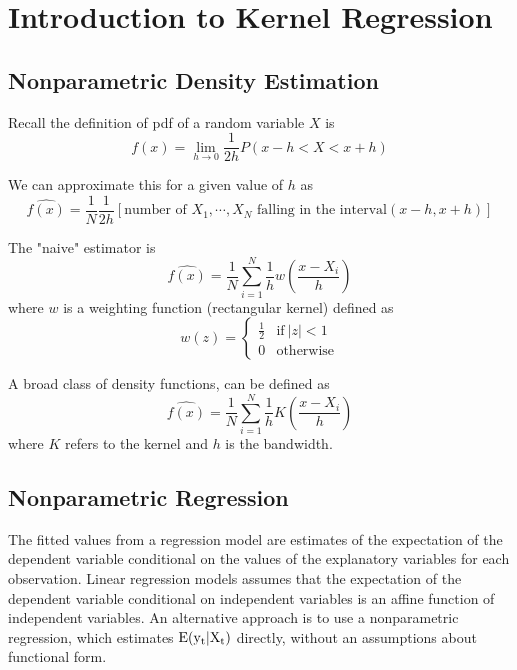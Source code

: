 \chapter{Introduction to Kernel Regression}


\section{Nonparametric Density Estimation}

Recall the definition of pdf of a random variable $X$ is
\begin{equation}
f(x)=\lim_{h \rightarrow 0} \frac{1}{2h} P(x-h < X < x+h)
\end{equation}

We can approximate this for a given value of $h$ as
\begin{equation}
\hat{f(x)}=\frac{1}{N} \frac{1}{2h} [\mbox{number of $X_1, \cdots,
X_N$ falling in the interval} (x-h, x+h)]
\end{equation}

The "naive" estimator is
\begin{equation}
\hat{f(x)}=\frac{1}{N} \sum_{i=1}^N \frac{1}{h} w(\frac{x-X_i}{h})
\end{equation}
where $w$ is a weighting function (rectangular kernel) defined as
\begin{equation}
w(z)=\left\{ \begin{array}{ll} \frac{1}{2} & \textrm{if} \ |z|<1
\\ 0 & \textrm{otherwise} \end{array} \right.
\end{equation}

A broad class of density functions, can be defined as
\begin{equation}
\hat{f(x)}=\frac{1}{N} \sum_{i=1}^N \frac{1}{h} K(\frac{x-X_i}{h})
\end{equation}
where $K$ refers to the kernel and $h$ is the bandwidth.

\section{Nonparametric Regression}

The fitted values from a regression model are estimates of the
expectation of the dependent variable conditional on the values of the
explanatory variables for each observation.  Linear regression models
assumes that the expectation of the dependent variable conditional on
independent variables is an affine function of independent variables.
An alternative approach is to use a nonparametric regression, which
estimates $\rm E(y_t|X_t)$ directly, without an assumptions about
functional form.

